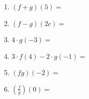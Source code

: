\documentclass[12pt, twoside]{report}
\begin{document}
  \begin{enumerate}
    \item
      \((f + g)(5) =\)\vfill 
    \item
      \((f - g)(2c) =\) \vfill 
    \item
      \(4 \cdot g( - 3) =\) 
      \vfill 
      

    \item 
      \(3 \cdot f(4) - 2 \cdot g( - 1) =\) 
      \vfill 
      
      \item
      \((fg)( - 2) =\) 
      \vfill 
      
    \item 
     \(\left( \frac{f}{g} \right)(0) =\) 
     \vfill 
     

%      
%      
  \end{enumerate}
\end{document}
